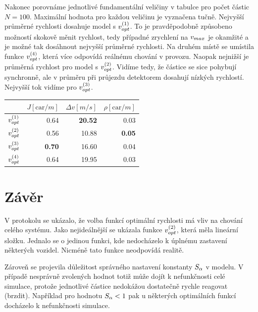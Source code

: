 \documentclass[a4paper, 12pt, fleqn]{article}
\begin{document}

Nakonec porovnáme jednotlivé fundamentální veličiny v tabulce pro počet částic \linebreak $N = 100$. Maximální hodnota pro každou veličinu je vyznačena tučně. Nejvyšší průměrné rychlosti dosahuje model s $v_{opt}^{(1)}$. To je pravděpodobně způsobeno možností skokově měnit rychlost, tedy případné zrychlení na $v_{max}$ je okamžité a je možné tak dosáhnout nejvyšší průměrné rychlosti. Na druhém místě se umístila funkce $v_{opt}^{(4)}$, která více odpovídá reálnému chování v provozu. Naopak nejnižší je průměrná rychlost pro model s $v_{opt}^{(2)}$. Vidíme tedy, že částice se sice pohybují synchronně, ale v průměru při průjezdu detektorem dosahují nízkých rychlostí. Nejvyšší tok vidíme pro $v_{opt}^{(3)}$. 

\begin{table}[h]
	\centering
	\begin{tabular}{rrrr}
		\toprule
			 			& $J [\mathrm{car}/m]$ 	& $\Delta v [m/s]$ 	& $\rho [\mathrm{car}/m]$ \\ \midrule
		$v_{opt}^{(1)}$	& 0.64 					& \textbf{20.52}	& 0.03 \\ \midrule 
		$v_{opt}^{(2)}$	& 0.56					& 10.88				& \textbf{0.05} \\ \midrule
		$v_{opt}^{(3)}$	& \textbf{0.70}			& 16.60				& 0.04 \\ \midrule
		$v_{opt}^{(4)}$	& 0.64					& 19.95				& 0.03 \\ \bottomrule
	\end{tabular}
\end{table}

\pagebreak
\section{Závěr}

V protokolu se ukázalo, že volba funkcí optimální rychlosti má vliv na chování celého systému. Jako nejideálnější se ukázala funkce $v_{opt}^{(2)}$, která měla lineární složku. Jednalo se o jedinou funkci, kde nedocházelo k úplnému zastavení některých vozidel. Nicméně tato funkce neodpovídá realitě.

Zároveň se projevila důležitost správného nastavení konstanty $S_{\alpha}$ v modelu. V případě nesprávně zvolených hodnot totiž může dojít k nefunkčnosti celé simulace, protože jednotlivé částice nedokážou dostatečně rychle reagovat (brzdit). Například pro hodnotu $S_{\alpha} < 1$ pak u některých optimálních funkcí docházelo k nefunkčnosti simulace.
\end{document}
